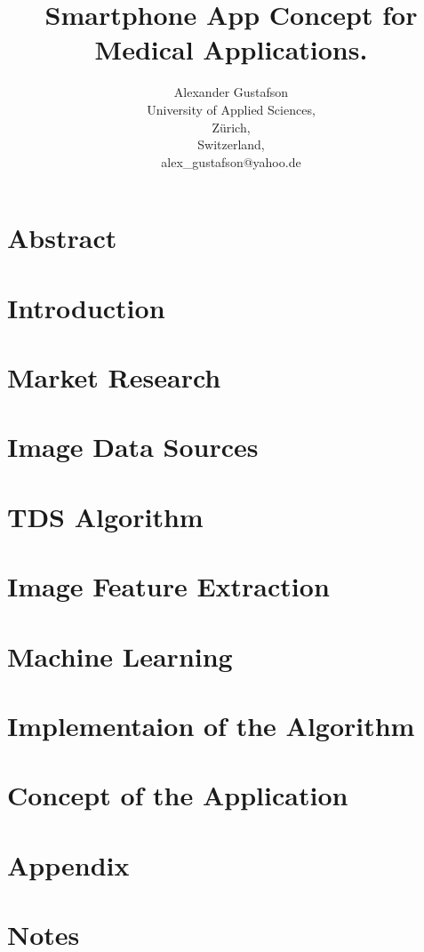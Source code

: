 \documentclass{report}
\title{Smartphone App Concept for Medical Applications.}
\author{Alexander Gustafson\\
  University of Applied Sciences,\\
  Zürich,\\
  Switzerland,\\
  alex\_gustafson@yahoo.de}
\date{\parbox{\linewidth}{\centering%
  \today\endgraf\bigskip
  Dozent: Reto Knaack (knaa@zhaw.ch)\endgraf\bigskip
  School of Engineering, Abteilung Zürich \endgraf
  Studiengang Informatik\endgraf
  }}
\begin{document}
\maketitle

\chapter*{Abstract}


\tableofcontents

\chapter{Introduction}



\chapter{Market Research}


\chapter{Image Data Sources}


\chapter{TDS Algorithm}


\chapter{Image Feature Extraction}


\chapter{Machine Learning}


\chapter{Implementaion of the Algorithm}


\chapter{Concept of the Application}


{}


\chapter{Appendix}

\chapter{Notes}

\end{document}
